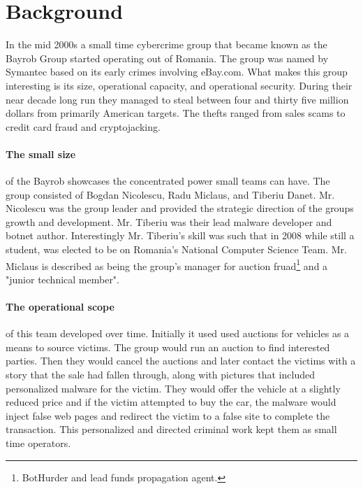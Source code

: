 \documentclass[fleqn,12pt]{SelfArx} %
\affiliation{\textsuperscript{1}\textit{Department of Computer Science and Engineering, Bagley College of Engineering, Mississippi State University}} %
\begin{document}
\renewcommand{\abstractname}{Issue}


\flushbottom %

\maketitle %


\thispagestyle{empty} %


\section*{Background} 
In the mid 2000s a small time cybercrime group that became known as the Bayrob Group started operating out of Romania.  The group was named by Symantec based on its early crimes involving eBay.com.\cite{Cimpanu:ZD:Bayrob}  What makes this group interesting is its size, operational capacity, and operational security.  During their near decade long run they managed to steal between four and thirty five million dollars from primarily American targets.  The thefts ranged from sales scams to credit card fraud and cryptojacking.    

\paragraph{The small size} of the Bayrob showcases the concentrated power small teams can have.  The group consisted of Bogdan Nicolescu, Radu Miclaus, and Tiberiu Danet.  Mr. Nicolescu was the group leader and provided the strategic direction of the groups growth and development.  Mr. Tiberiu was their lead malware developer and botnet author.  Interestingly Mr. Tiberiu's skill was such that in 2008 while still a student, was elected to be on Romania's National Computer Science Team.\cite{Cimpanu:ZD:Bayrob}  Mr. Miclaus is described as being the group's manager for auction fruad\footnote{BotHurder and lead funds propagation agent.} and a "junior technical member"\cite{Symantech:Blog:Bayrob}.

\paragraph{The operational scope} of this team developed over time.  Initially it used used auctions for vehicles as a means to source victims.  The group would run an auction to find interested parties.  Then they would cancel the auctions and later contact the victims with a story that the sale had fallen through, along with pictures that included personalized malware for the victim.  They would offer the vehicle at a slightly reduced price and if the victim attempted to buy the car, the malware would inject false web pages and redirect the victim to a false site to complete the transaction.   This personalized and directed criminal work kept them as small time operators.
\end{document}
